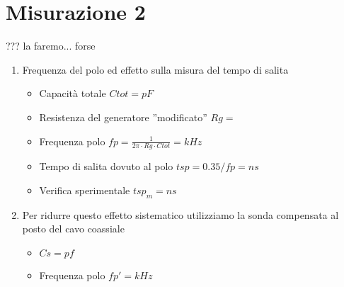 \documentclass{report}
\begin{document}
\section{Misurazione 2}
??? la faremo... forse

\begin{enumerate}
\item Frequenza del polo ed effetto sulla misura del tempo di salita
  \begin{itemize}
    \item Capacità totale \(Ctot = pF\)
    \item Resistenza del generatore ”modificato” \(Rg= \)
    \item Frequenza polo \(fp = \tfrac{1}{2\pi \cdot Rg \cdot Ctot} = kHz \)
    \item Tempo di salita dovuto al polo \(tsp= 0.35/fp = ns\)
    \item Verifica sperimentale \(tsp_m = ns\)
    \end{itemize}

\item Per ridurre questo effetto sistematico utilizziamo la sonda compensata al posto del cavo coassiale
 \begin{itemize}
 \item  \(Cs= pf\)
\item Frequenza polo \(fp' = kHz\)
 \end{itemize}
\end{enumerate}
\end{document}
